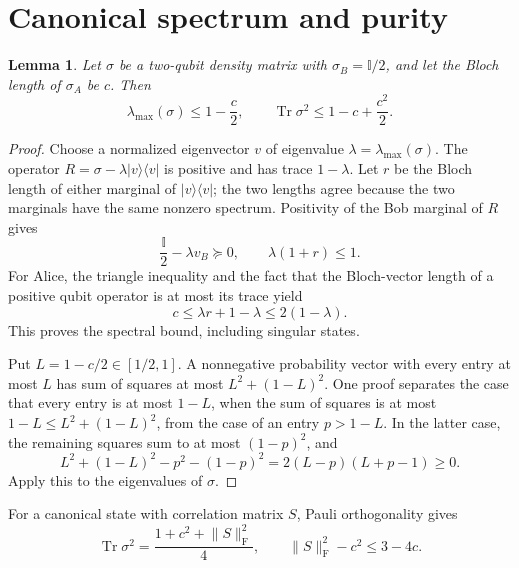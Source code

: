 \documentclass[11pt]{article}
\newtheorem{lemma}[theorem]{Lemma}
\newcommand{\tr}{\operatorname{Tr}}
\newcommand{\Id}{\mathbb{I}}
\newcommand{\ket}[1]{\lvert #1\rangle}
\newcommand{\bra}[1]{\langle #1\rvert}
\newcommand{\norm}[1]{\lVert #1\rVert}
\begin{document}
\section{Canonical spectrum and purity}
\begin{lemma}\label{lem:spectral}
Let $\sigma$ be a two-qubit density matrix with $\sigma_B=\Id/2$, and let the Bloch length of $\sigma_A$ be $c$. Then
\[
 \lambda_{\max}(\sigma)\leq1-\frac c2,
 \qquad
 \tr\sigma^2\leq1-c+\frac{c^2}{2}.
\]
\end{lemma}
\begin{proof}
Choose a normalized eigenvector $v$ of eigenvalue $\lambda=\lambda_{\max}(\sigma)$. The operator $R=\sigma-\lambda\ket v\bra v$ is positive and has trace $1-\lambda$. Let $r$ be the Bloch length of either marginal of $\ket v\bra v$; the two lengths agree because the two marginals have the same nonzero spectrum. Positivity of the Bob marginal of $R$ gives
\[
 \frac{\Id}{2}-\lambda v_B\succeq0,
 \qquad \lambda(1+r)\leq1.
\]
For Alice, the triangle inequality and the fact that the Bloch-vector length of a positive qubit operator is at most its trace yield
\[
 c\leq\lambda r+1-\lambda\leq2(1-\lambda).
\]
This proves the spectral bound, including singular states.

Put $L=1-c/2\in[1/2,1]$. A nonnegative probability vector with every entry at most $L$ has sum of squares at most $L^2+(1-L)^2$. One proof separates the case that every entry is at most $1-L$, when the sum of squares is at most $1-L\leq L^2+(1-L)^2$, from the case of an entry $p>1-L$. In the latter case, the remaining squares sum to at most $(1-p)^2$, and
\[
 L^2+(1-L)^2-p^2-(1-p)^2
   =2(L-p)(L+p-1)\geq0.
\]
Apply this to the eigenvalues of $\sigma$.
\end{proof}

For a canonical state with correlation matrix $S$, Pauli orthogonality gives
\begin{equation}\label{eq:canonicalbudget}
 \tr\sigma^2=\frac{1+c^2+\norm S_{\mathrm F}^{2}}4,
 \qquad \norm S_{\mathrm F}^{2}-c^2\leq3-4c.
\end{equation}
\end{document}

